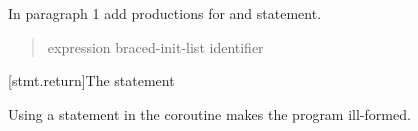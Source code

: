 In paragraph 1 add productions for  and  statement.

\begin{quote}
\begin{bnf}
	\br
	\br
	\br
	 expression\opt \terminal{;}\br
	 braced-init-list \terminal{;}\br
	\br
  \br
  \br
	\br
	 identifier \terminal{;}
\end{bnf}
\end{quote}

\setcounter{subsection}{2}
[stmt.return]{The  statement}%
%
%

\pnum
Using a  statement in the coroutine makes the program ill-formed. 

%

